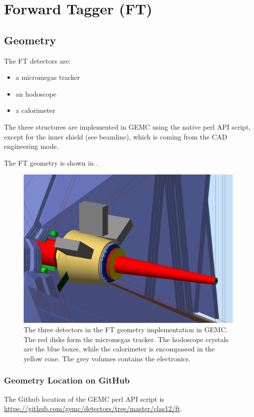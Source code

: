 \section{Forward Tagger (FT)}


\subsection{Geometry}

The FT detectors are:

\begin{itemize}
	\item a micromegas tracker
	\item an hodoscope
 	\item a calorimeter
\end{itemize}

The three structures are implemented in GEMC using the native perl API script, except for the inner shield (see beamline), which is coming from the CAD engineering mode.

The FT geometry is shown in .


\begin{figure}
	\centering
	\includegraphics[width=0.95\columnwidth,keepaspectratio]{img/ftGeometry.png}
	\caption{The three detectors in the FT geometry implementation in GEMC. The red disks form the micromegas tracker. The hodoscope crystals are the blue boxes,
            while the calorimeter is encompassed in the yellow cone. The grey volumes contains the electronics.}
	\label{fig:ftGeometry}
\end{figure}




\subsubsection{Geometry Location on GitHub}
The Github location of the GEMC perl API script is \url{https://github.com/gemc/detectors/tree/master/clas12/ft}.


